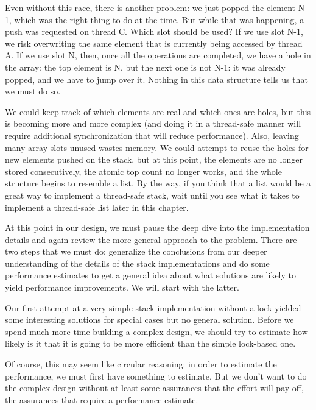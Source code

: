 Even without this race, there is another problem: we just popped the element N-1, which was the right thing to do at the time. But while that was happening, a push was requested on thread C. Which slot should be used? If we use slot N-1, we risk overwriting the same element that is currently being accessed by thread A. If we use slot N, then, once all the operations are completed, we have a hole in the array: the top element is N, but the next one is not N-1: it was already popped, and we have to jump over it. Nothing in this data structure tells us that we must do so.

We could keep track of which elements are real and which ones are holes, but this is becoming more and more complex (and doing it in a thread-safe manner will require additional synchronization that will reduce performance). Also, leaving many array slots unused wastes memory. We could attempt to reuse the holes for new elements pushed on the stack, but at this point, the elements are no longer stored consecutively, the atomic top count no longer works, and the whole structure begins to resemble a list. By the way, if you think that a list would be a great way to implement a thread-safe stack, wait until you see what it takes to implement a thread-safe list later in this chapter.

At this point in our design, we must pause the deep dive into the implementation details and again review the more general approach to the problem. There are two steps that we must do: generalize the conclusions from our deeper understanding of the details of the stack implementations and do some performance estimates to get a general idea about what solutions are likely to yield performance improvements. We will start with the latter.


Our first attempt at a very simple stack implementation without a lock yielded some interesting solutions for special cases but no general solution. Before we spend much more time building a complex design, we should try to estimate how likely is it that it is going to be more efficient than the simple lock-based one.

Of course, this may seem like circular reasoning: in order to estimate the performance, we must first have something to estimate. But we don't want to do the complex design without at least some assurances that the effort will pay off, the assurances that require a performance estimate.

